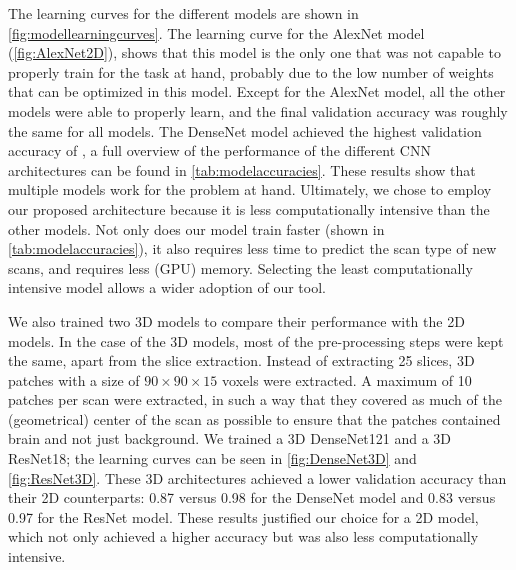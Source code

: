 \begin{subappendices}
The learning curves for the different models are shown in \cref{fig:modellearningcurves}.
The learning curve for the AlexNet model (\cref{fig:AlexNet2D}), shows that this model is the only one that was not capable to properly train for the task at hand, probably due to the low number of weights that can be optimized in this model.
Except for the AlexNet model, all the other models were able to properly learn, and the final validation accuracy was roughly the same for all models.
The DenseNet model achieved the highest validation accuracy of , a full overview of the performance of the different \gls{CNN} architectures can be found in \cref{tab:modelaccuracies}.
These results show that multiple models work for the problem at hand.
Ultimately, we chose to employ our proposed architecture because it is less computationally intensive than the other models.
Not only does our model train faster (shown in \cref{tab:modelaccuracies}), it also requires less time to predict the scan type of new scans, and requires less (GPU) memory.
Selecting the least computationally intensive model allows a wider adoption of our tool.

We also trained two 3D models to compare their performance with the 2D models.
In the case of the 3D models, most of the pre-processing steps were kept the same, apart from the \gls{slice} extraction.
Instead of extracting \num{25} \glspl{slice}, 3D patches with a size of $90\times90\times15$ voxels were extracted.
A maximum of \num{10} patches per \gls{scan} were extracted, in such a way that they covered as much of the (geometrical) center of the \gls{scan} as possible to ensure that the patches contained brain and not just background.
We trained a 3D DenseNet121 and a 3D ResNet18; the learning curves can be seen in \cref{fig:DenseNet3D} and \cref{fig:ResNet3D}.
These 3D architectures achieved a lower validation accuracy than their 2D counterparts: \num{0.87} versus \num{0.98} for the DenseNet model and \num{0.83} versus \num{0.97} for the ResNet model.
These results justified our choice for a 2D model, which not only achieved a higher accuracy but was also less computationally intensive.


\begin{figure}
\centering

\newlength{\modelplotwidth}
\setlength{\modelplotwidth}{0.23\textwidth}


\end{figure}
\end{subappendices}
